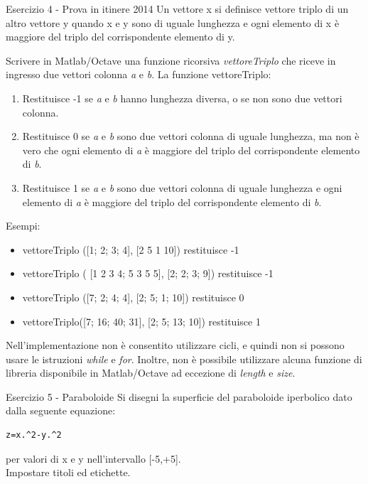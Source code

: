 \documentclass[handout]{beamer}
\begin{document}
\begin{frame}[allowframebreaks]{Esercizio 4 - Prova in itinere 2014}
	Un vettore x si definisce vettore triplo di un altro vettore y quando x e
	y sono di uguale lunghezza e ogni elemento di x è maggiore del triplo
	del corrispondente elemento di y.
	
	Scrivere in Matlab/Octave una funzione \alert{ricorsiva} \emph{vettoreTriplo} che
	riceve in ingresso due vettori \alert{colonna} \emph{a} e \emph{b}. La funzione
	vettoreTriplo:
	\begin{enumerate}
		\item Restituisce -1 se \emph{a} e \emph{b} hanno lunghezza diversa, o se non sono due vettori colonna.
		\item Restituisce 0 se \emph{a} e \emph{b} sono due vettori colonna di uguale
		lunghezza, ma non è vero che ogni elemento di \emph{a} è maggiore
		del triplo del corrispondente elemento di \emph{b}.
		\item Restituisce 1 se \emph{a} e \emph{b} sono due vettori colonna di uguale
		lunghezza e ogni elemento di \emph{a} è maggiore
		del triplo del corrispondente elemento di \emph{b}.
	\end{enumerate}

	Esempi:
	\begin{itemize}
		\item vettoreTriplo ([1; 2; 3; 4], [2 5 1 10]) restituisce -1
		\item vettoreTriplo ( [1 2 3 4; 5 3 5 5], [2; 2; 3; 9]) restituisce -1
		\item vettoreTriplo ([7; 2; 4; 4], [2; 5; 1; 10]) restituisce 0
		\item vettoreTriplo([7; 16; 40; 31], [2; 5; 13; 10]) restituisce 1
	\end{itemize}

	Nell’implementazione \alert{non} è consentito utilizzare cicli, e quindi \alert{non} si possono usare le istruzioni \emph{while} e \emph{for}. Inoltre, \alert{non} è possibile utilizzare alcuna funzione di libreria disponibile in Matlab/Octave ad eccezione di \emph{length} e \emph{size}.
\end{frame}

\begin{frame}[fragile]{Esercizio 5 - Paraboloide}
	Si disegni la superficie del paraboloide iperbolico dato dalla seguente
	equazione:
	\begin{lstlisting}
z=x.^2-y.^2
	\end{lstlisting}

	per valori di x e y nell'intervallo [-5,+5].\\
	Impostare titoli ed etichette.
\end{frame}
\end{document}
